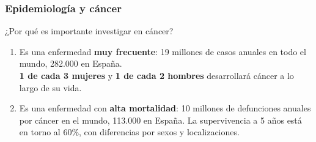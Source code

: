 \documentclass{beamer}
\begin{document}




\begin{frame}\frametitle{Epidemiología y cáncer}
	\begin{block}{¿Por qué es importante investigar en cáncer?}
		\begin{enumerate}
			\item Es una enfermedad \textbf{muy frecuente}: 19 millones de casos anuales en todo el mundo, 282.000 en España.\\ \Large{\textbf{1 de cada 3 mujeres} y \textbf{1 de cada 2 hombres} desarrollará cáncer a lo largo de su vida.}\\[2ex]
			\item \normalsize Es una enfermedad con \textbf{alta mortalidad}: 10 millones de defunciones anuales por cáncer en el mundo, 113.000 en España. La supervivencia a 5 años está en torno al 60\%, con diferencias por sexos y localizaciones.\\[2ex]
		\end{enumerate}
	\end{block}
\end{frame}
\end{document}
